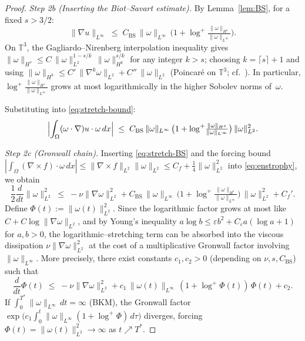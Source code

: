 \documentclass[12pt,a4paper]{article}
\theoremstyle{definition}
\theoremstyle{plain}
\theoremstyle{remark}
\begin{document}
\begin{proof}
\smallskip
\noindent\emph{Step 2b (Inserting the Biot--Savart estimate).}
By Lemma~\ref{lem:BS}, for a fixed $s > 3/2$:
\[
    \|\nabla u\|_{L^\infty}
    \;\le\; C_{\mathrm{BS}}\,\|\omega\|_{L^\infty}\,
            \bigl(1 + \log^+\!\tfrac{\|\omega\|_{H^s}}{\|\omega\|_{L^\infty}}\bigr).
\]
On $\mathbb{T}^3$, the Gagliardo--Nirenberg interpolation inequality gives
$\|\omega\|_{H^s} \le C\,\|\omega\|_{L^2}^{1-s/k}\,\|\omega\|_{H^k}^{s/k}$
for any integer $k > s$; choosing $k = \lceil s \rceil + 1$ and using
$\|\omega\|_{H^k} \le C'\,\|\nabla^k \omega\|_{L^2} + C''\,\|\omega\|_{L^2}$
(Poincar\'{e} on $\mathbb{T}^3$; cf.\ \cite{ConstantinFoias1988}).
In particular, $\log^+\!\tfrac{\|\omega\|_{H^s}}{\|\omega\|_{L^\infty}}$ grows
at most logarithmically in the higher Sobolev norms of~$\omega$.

Substituting into \eqref{eq:stretch-bound}:
\begin{equation}\label{eq:stretch-BS}
    \Bigl|\int_\Omega (\omega\cdot\nabla)u\cdot\omega\,dx\Bigr|
    \;\le\; C_{\mathrm{BS}}\,\|\omega\|_{L^\infty}\,
            \bigl(1 + \log^+\!\tfrac{\|\omega\|_{H^s}}{\|\omega\|_{L^\infty}}\bigr)\,
            \|\omega\|_{L^2}^2.
\end{equation}

\smallskip
\noindent\emph{Step 2c (Gronwall chain).}
Inserting \eqref{eq:stretch-BS} and the forcing bound
$|\int_\Omega(\nabla\times f)\cdot\omega\,dx|
\le \|\nabla\times f\|_{L^2}\|\omega\|_{L^2}
\le C_f + \tfrac{1}{4}\|\omega\|_{L^2}^2$ into \eqref{eq:enstrophy}, we obtain
\[
    \frac{1}{2}\frac{d}{dt}\|\omega\|_{L^2}^2
    \;\le\;
    -\nu\|\nabla\omega\|_{L^2}^2
    + C_{\mathrm{BS}}\,\|\omega\|_{L^\infty}\,
      \bigl(1 + \log^+\!\tfrac{\|\omega\|_{H^s}}{\|\omega\|_{L^\infty}}\bigr)\,
      \|\omega\|_{L^2}^2
    + C_f'.
\]
Define $\Phi(t) := \|\omega(t)\|_{L^2}^2$.  Since the logarithmic factor
grows at most like $C + C\log\|\nabla\omega\|_{L^2}$, and by Young's inequality
$a\log b \le \varepsilon b^2 + C_\varepsilon a(\log a + 1)$ for $a,b > 0$,
the logarithmic--stretching term can be absorbed into the viscous dissipation
$\nu\|\nabla\omega\|_{L^2}^2$ at the cost of a multiplicative Gronwall factor
involving $\|\omega\|_{L^\infty}$.  More precisely, there exist constants
$c_1, c_2 > 0$ (depending on $\nu, s, C_{\mathrm{BS}}$) such that
\begin{equation}\label{eq:Gronwall-enst}
    \frac{d}{dt}\Phi(t)
    \;\le\;
    -\nu\|\nabla\omega\|_{L^2}^2
    + c_1\,\|\omega(t)\|_{L^\infty}\,(1 + \log^+\Phi(t))\,\Phi(t)
    + c_2.
\end{equation}
If $\int_0^{T^*}\|\omega\|_{L^\infty}\,dt = \infty$ (BKM), the Gronwall
factor $\exp\!\bigl(c_1\int_0^t\|\omega\|_{L^\infty}(1+\log^+\Phi)\,d\tau\bigr)$
diverges, forcing $\Phi(t) = \|\omega(t)\|_{L^2}^2 \to \infty$ as
$t \nearrow T^*$.


\end{proof}
\end{document}
